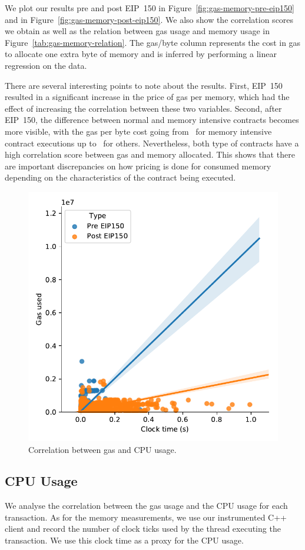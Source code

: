 We plot our results pre and post EIP~150 in Figure~\ref{fig:gas-memory-pre-eip150} and in Figure~\ref{fig:gas-memory-post-eip150}. We also show the correlation scores we obtain as well as the relation between gas usage and memory usage in Figure~\ref{tab:gas-memory-relation}. The gas/byte column represents the cost in gas to allocate one extra byte of memory and is inferred by performing a linear regression on the data.

There are several interesting points to note about the results. First, EIP~150 resulted in a significant increase in the price of gas per memory, which had the effect of increasing the correlation between these two variables. Second, after EIP~150, the difference between normal and memory intensive contracts becomes more visible, with the gas per byte cost going from~ for memory intensive contract executions up to~ for others. Nevertheless, both type of contracts have a high correlation score between gas and memory allocated. This shows that there are important discrepancies on how pricing is done for consumed memory depending on the characteristics of the contract being executed.

\begin{figure}[tb]
  \centering\includegraphics[width=.8\columnwidth]{figures/cpu-usage-1400000-1500000--2500000-2600000.pdf}
  \caption{Correlation between gas and CPU usage.}
  \label{fig:gas-cpu}
\end{figure}

\subsection{CPU Usage}
We analyse the correlation between the gas usage and the CPU usage for each transaction. As for the memory measurements, we use our instrumented C++ client and record the number of clock ticks used by the thread executing the transaction. We use this clock time as a proxy for the CPU usage.

